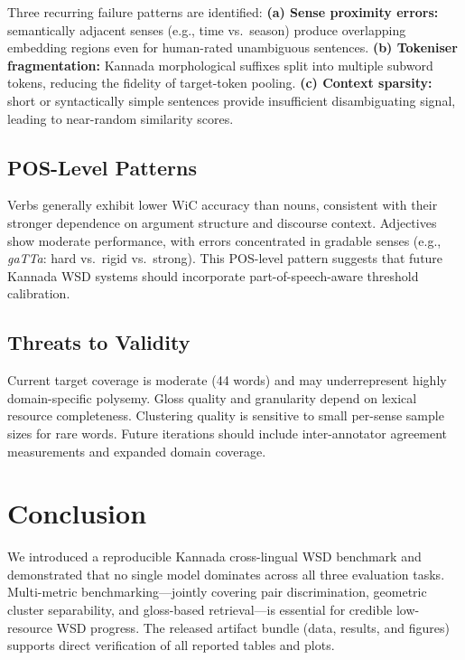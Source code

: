 \documentclass[conference]{IEEEtran}
\begin{document}
Three recurring failure patterns are identified:
\textbf{(a) Sense proximity errors:} semantically adjacent senses (e.g., time
vs.\ season) produce overlapping embedding regions even for human-rated
unambiguous sentences.
\textbf{(b) Tokeniser fragmentation:} Kannada morphological suffixes split into
multiple subword tokens, reducing the fidelity of target-token pooling.
\textbf{(c) Context sparsity:} short or syntactically simple sentences provide
insufficient disambiguating signal, leading to near-random similarity scores.

\subsection{POS-Level Patterns}

Verbs generally exhibit lower WiC accuracy than nouns, consistent with
their stronger dependence on argument structure and discourse context.
Adjectives show moderate performance, with errors concentrated in
gradable senses (e.g., \textit{gaTTa}: hard vs.\ rigid vs.\ strong).
This POS-level pattern suggests that future Kannada WSD systems should
incorporate part-of-speech-aware threshold calibration.

\subsection{Threats to Validity}

Current target coverage is moderate (44 words) and may underrepresent
highly domain-specific polysemy.
Gloss quality and granularity depend on lexical resource completeness.
Clustering quality is sensitive to small per-sense sample sizes for rare words.
Future iterations should include inter-annotator agreement measurements and
expanded domain coverage.

\section{Conclusion}

We introduced a reproducible Kannada cross-lingual WSD benchmark and demonstrated
that no single model dominates across all three evaluation tasks.
Multi-metric benchmarking---jointly covering pair discrimination, geometric
cluster separability, and gloss-based retrieval---is essential for credible
low-resource WSD progress.
The released artifact bundle (data, results, and figures) supports direct
verification of all reported tables and plots.
\end{document}
